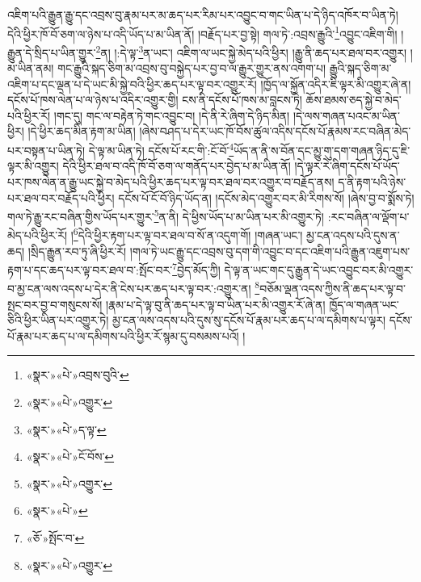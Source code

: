 འཇིག་པའི་རྒྱུན་རྒྱུ་དང་འབྲས་བུ་རྣམ་པར་མ་ཆད་པར་རིམ་པར་འབྱུང་བ་གང་ཡིན་པ་དེ་ཉིད་འཁོར་བ་ཡིན་ཏེ། དེའི་ཕྱིར་ཁོ་བོ་ཅག་ལ་ཉེས་པ་འདི་ཡོད་པ་མ་ཡིན་ནོ། །བརྗོད་པར་བྱ་སྟེ། གལ་ཏེ་:འབྲས་རྒྱུའི་\footnote{«སྣར་»«པེ་»འབྲས་བུའི་}འབྱུང་འཇིག་གི། །རྒྱུན་དེ་སྲིད་པ་ཡིན་གྱུར་\footnote{«སྣར་»«པེ་»འགྱུར་}ན། །:དེ་ལྟ་\footnote{«སྣར་»«པེ་»ད་ལྟ་}ན་ཡང་། འཇིག་ལ་ཡང་སྐྱེ་མེད་པའི་ཕྱིར། །རྒྱུ་ནི་ཆད་པར་ཐལ་བར་འགྱུར། །མ་ཡིན་ནམ། གང་རྒྱུའི་སྐད་ཅིག་མ་འབྲས་བུ་བསྐྱེད་པར་བྱ་བ་ལ་རྒྱུར་གྱུར་ནས་འགག་པ། རྒྱུའི་སྐད་ཅིག་མ་འཇིག་པ་དང་ལྡན་པ་དེ་ཡང་མི་སྐྱེ་བའི་ཕྱིར་ཆད་པར་ལྟ་བར་འགྱུར་རོ། །ཁྱོད་ལ་སྐྱོན་འདིར་ཇི་ལྟར་མི་འགྱུར་ཞེ་ན། དངོས་པོ་ཁས་ལེན་པ་ལ་ཉེས་པ་འདིར་འགྱུར་གྱི། ངས་ནི་དངོས་པོ་ཁས་མ་བླངས་ཏེ། ཆོས་ཐམས་ཅད་སྐྱེ་བ་མེད་པའི་ཕྱིར་རོ། །གང་དུ། གང་ལ་བརྟེན་ཏེ་གང་འབྱུང་བ། །དེ་ནི་རེ་ཞིག་དེ་ཉིད་མིན། །དེ་ལས་གཞན་པའང་མ་ཡིན་ཕྱིར། །དེ་ཕྱིར་ཆད་མིན་རྟག་མ་ཡིན། །ཞེས་བཤད་པ་དེར་ཡང་ཁོ་བོས་ཚུལ་འདིས་དངོས་པོ་རྣམས་རང་བཞིན་མེད་པར་བསྟན་པ་ཡིན་ཏེ། དེ་ལྟ་མ་ཡིན་ཏེ། དངོས་པོ་རང་གི་:ངོ་བོ་\footnote{«སྣར་»«པེ་»ངོ་བོས་}ཡོད་ན་ནི་ས་བོན་དང་མྱུ་གུ་དག་གཞན་ཉིད་དུ་ཇི་ལྟར་མི་འགྱུར། དེའི་ཕྱིར་ཐལ་བ་འདི་ཁོ་བོ་ཅག་ལ་གནོད་པར་བྱེད་པ་མ་ཡིན་ནོ། །དེ་ལྟར་རེ་ཞིག་དངོས་པོ་ཡོད་པར་ཁས་ལེན་ན་རྒྱུ་ཡང་སྐྱེ་བ་མེད་པའི་ཕྱིར་ཆད་པར་ལྟ་བར་ཐལ་བར་འགྱུར་བ་བརྗོད་ནས། ད་ནི་རྟག་པའི་ཉེས་པར་ཐལ་བར་བརྗོད་པའི་ཕྱིར། དངོས་པོ་ངོ་བོ་ཉིད་ཡོད་ན། །དངོས་མེད་འགྱུར་བར་མི་རིགས་སོ། །ཞེས་བྱ་བ་སྨོས་ཏེ། གལ་ཏེ་རྒྱུ་རང་བཞིན་གྱིས་ཡོད་པར་གྱུར་\footnote{«སྣར་»«པེ་»འགྱུར་}ན་ནི། དེ་ཕྱིས་ཡོད་པ་མ་ཡིན་པར་མི་འགྱུར་ཏེ། :རང་བཞིན་ལ་ལྡོག་པ་མེད་པའི་ཕྱིར་རོ། །\footnote{«སྣར་»«པེ་»}དེའི་ཕྱིར་རྟག་པར་ལྟ་བར་ཐལ་བ་སོ་ན་འདུག་གོ། །གཞན་ཡང་། མྱ་ངན་འདས་པའི་དུས་ན་ཆད། །སྲིད་རྒྱུན་རབ་ཏུ་ཞི་ཕྱིར་རོ། །གལ་ཏེ་ཡང་རྒྱུ་དང་འབྲས་བུ་དག་གི་འབྱུང་བ་དང་འཇིག་པའི་རྒྱུན་འཇུག་པས་རྟག་པ་དང་ཆད་པར་ལྟ་བར་ཐལ་བ་:སྤོང་བར་\footnote{«ཅོ་»སྤོང་བ་}བྱེད་མོད་ཀྱི། དེ་ལྟ་ན་ཡང་གང་དུ་རྒྱུན་དེ་ཡང་འབྱུང་བར་མི་འགྱུར་བ་མྱ་ངན་ལས་འདས་པ་དེར་ནི་ངེས་པར་ཆད་པར་ལྟ་བར་:འགྱུར་ན། \footnote{«སྣར་»«པེ་»འགྱུར་}བཅོམ་ལྡན་འདས་ཀྱིས་ནི་ཆད་པར་ལྟ་བ་སྤང་བར་བྱ་བ་གསུངས་སོ། །རྣམ་པ་དེ་ལྟ་བུ་ནི་ཆད་པར་ལྟ་བ་ཡིན་པར་མི་འགྱུར་རོ་ཞེ་ན། ཁྱོད་ལ་གཞན་ཡང་ཅིའི་ཕྱིར་ཡིན་པར་འགྱུར་ཏེ། མྱ་ངན་ལས་འདས་པའི་དུས་སུ་དངོས་པོ་རྣམ་པར་ཆད་པ་ལ་དམིགས་པ་ལྟར། དངོས་པོ་རྣམ་པར་ཆད་པ་ལ་དམིགས་པའི་ཕྱིར་རོ་སྙམ་དུ་བསམས་པའོ། །
